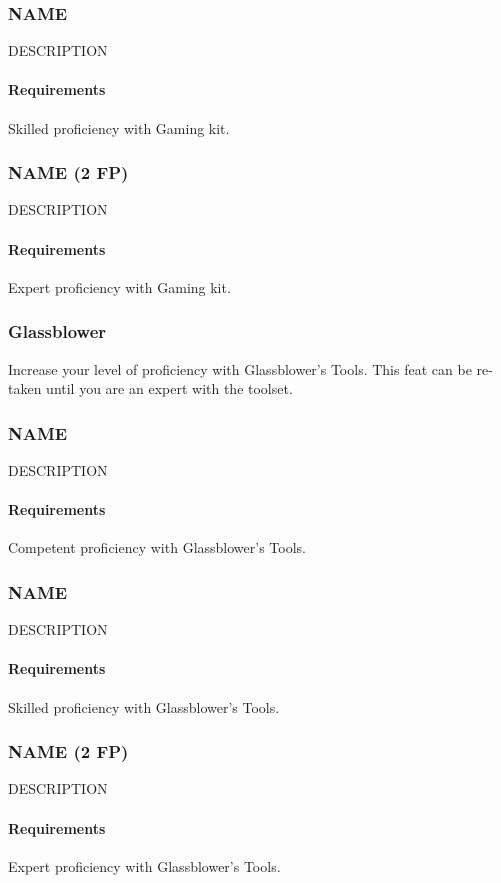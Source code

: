 \subsubsection{NAME} \label{feat::name}
    DESCRIPTION
    \paragraph{Requirements} Skilled proficiency with Gaming kit.
\subsubsection{NAME (2 FP)} \label{feat::name}
    DESCRIPTION
    \paragraph{Requirements} Expert proficiency with Gaming kit.
\subsubsection{Glassblower} \label{feat::glassblower}
    Increase your level of proficiency with Glassblower's Tools.
    This feat can be re-taken until you are an expert with the toolset.
\subsubsection{NAME} \label{feat::name}
    DESCRIPTION
    \paragraph{Requirements} Competent proficiency with Glassblower's Tools.
\subsubsection{NAME} \label{feat::name}
    DESCRIPTION
    \paragraph{Requirements} Skilled proficiency with Glassblower's Tools.
\subsubsection{NAME (2 FP)} \label{feat::name}
    DESCRIPTION
    \paragraph{Requirements} Expert proficiency with Glassblower's Tools.
